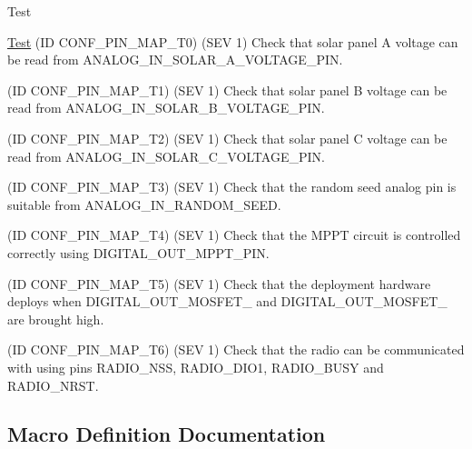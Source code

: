 \begin{DoxyRefDesc}{Test}
\item[\hyperlink{test__test000022}{Test}](ID C\+O\+N\+F\+\_\+\+P\+I\+N\+\_\+\+M\+A\+P\+\_\+\+T0) (S\+EV 1) Check that solar panel A voltage can be read from A\+N\+A\+L\+O\+G\+\_\+\+I\+N\+\_\+\+S\+O\+L\+A\+R\+\_\+\+A\+\_\+\+V\+O\+L\+T\+A\+G\+E\+\_\+\+P\+IN. 

(ID C\+O\+N\+F\+\_\+\+P\+I\+N\+\_\+\+M\+A\+P\+\_\+\+T1) (S\+EV 1) Check that solar panel B voltage can be read from A\+N\+A\+L\+O\+G\+\_\+\+I\+N\+\_\+\+S\+O\+L\+A\+R\+\_\+\+B\+\_\+\+V\+O\+L\+T\+A\+G\+E\+\_\+\+P\+IN. 

(ID C\+O\+N\+F\+\_\+\+P\+I\+N\+\_\+\+M\+A\+P\+\_\+\+T2) (S\+EV 1) Check that solar panel C voltage can be read from A\+N\+A\+L\+O\+G\+\_\+\+I\+N\+\_\+\+S\+O\+L\+A\+R\+\_\+\+C\+\_\+\+V\+O\+L\+T\+A\+G\+E\+\_\+\+P\+IN. 

(ID C\+O\+N\+F\+\_\+\+P\+I\+N\+\_\+\+M\+A\+P\+\_\+\+T3) (S\+EV 1) Check that the random seed analog pin is suitable from A\+N\+A\+L\+O\+G\+\_\+\+I\+N\+\_\+\+R\+A\+N\+D\+O\+M\+\_\+\+S\+E\+ED. 

(ID C\+O\+N\+F\+\_\+\+P\+I\+N\+\_\+\+M\+A\+P\+\_\+\+T4) (S\+EV 1) Check that the M\+P\+PT circuit is controlled correctly using D\+I\+G\+I\+T\+A\+L\+\_\+\+O\+U\+T\+\_\+\+M\+P\+P\+T\+\_\+\+P\+IN. 

(ID C\+O\+N\+F\+\_\+\+P\+I\+N\+\_\+\+M\+A\+P\+\_\+\+T5) (S\+EV 1) Check that the deployment hardware deploys when D\+I\+G\+I\+T\+A\+L\+\_\+\+O\+U\+T\+\_\+\+M\+O\+S\+F\+E\+T\+\_ and D\+I\+G\+I\+T\+A\+L\+\_\+\+O\+U\+T\+\_\+\+M\+O\+S\+F\+E\+T\+\_ are brought high. 

(ID C\+O\+N\+F\+\_\+\+P\+I\+N\+\_\+\+M\+A\+P\+\_\+\+T6) (S\+EV 1) Check that the radio can be communicated with using pins R\+A\+D\+I\+O\+\_\+\+N\+SS, R\+A\+D\+I\+O\+\_\+\+D\+I\+O1, R\+A\+D\+I\+O\+\_\+\+B\+U\+SY and R\+A\+D\+I\+O\+\_\+\+N\+R\+ST.\end{DoxyRefDesc}


\subsection{Macro Definition Documentation}
\mbox{\label{group__defines__pin__map_ga2c37472ba18c707ade2c29026d3ae381}} 
